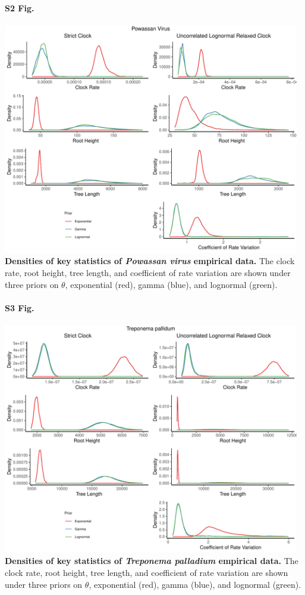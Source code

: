 \documentclass[10pt,letterpaper]{article}
\begin{document}
\paragraph*{S2 Fig.}
\label{S2_Fig}
	\begin{center}
		\includegraphics[width=13cm]{sandbox_figures/powv_density_plot.pdf}\newline
		\textbf{Densities of key statistics of \textit{Powassan virus} empirical data.} The clock rate, root height, tree length, and coefficient of rate variation are shown under three priors on $\theta$, exponential (red), gamma (blue), and lognormal (green).
	\end{center}
\paragraph*{S3 Fig.}
\label{S3_Fig}
	\begin{center}
		\includegraphics[width=13cm]{sandbox_figures/treponema_density_plot.pdf}\newline
		\textbf{Densities of key statistics of \textit{Treponema palladium} empirical data.} The clock rate, root height, tree length, and coefficient of rate variation are shown under three priors on $\theta$, exponential (red), gamma (blue), and lognormal (green).
	\end{center}
\end{document}
